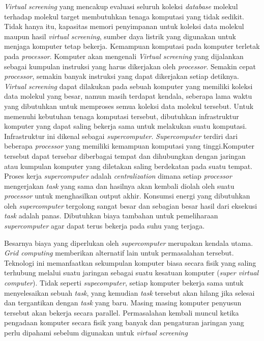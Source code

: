 \textit{Virtual screening} yang mencakup evaluasi seluruh koleksi \textit{database} molekul terhadap molekul target membutuhkan tenaga komputasi yang tidak sedikit. Tidak hanya itu, kapasitas memori penyimpanan untuk koleksi data molekul maupun hasil \textit{virtual screening}, sumber daya listrik yang digunakan untuk menjaga komputer tetap bekerja. Kemampuan komputasi pada komputer terletak pada \textit{processor}. Komputer akan mengenali \textit{Virtual screening} yang dijalankan sebagai kumpulan instruksi yang harus dikerjakan oleh \textit{processor}. Semakin cepat \textit{processor}, semakin banyak instruksi yang dapat dikerjakan setiap detiknya. \textit{Virtual screening} dapat dilakukan pada sebuah komputer yang memiliki koleksi data molekul yang besar, namun masih terdapat kendala, seberapa lama waktu yang dibutuhkan untuk memproses semua koleksi data molekul tersebut. Untuk memenuhi kebutuhan tenaga komputasi tersebut, dibutuhkan infrastruktur komputer yang dapat saling bekerja sama untuk melakukan suatu komputasi. Infrastruktur ini dikenal sebagai \textit{supercomputer}. \textit{Supercomputer} terdiri dari beberapa \textit{processor} yang memiliki kemampuan komputasi yang tinggi.Komputer tersebut dapat tersebar diberbagai tempat dan dihubungkan dengan jaringan atau kumpulan komputer yang diletakan saling berdekatan pada suatu tempat. Proses kerja \textit{supercomputer} adalah \textit{centralization} dimana setiap \textit{processor} mengerjakan \textit{task} yang sama dan hasilnya akan kembali diolah oleh suatu \textit{processor} untuk menghasilkan output akhir. Konsumsi energi yang dibutuhkan oleh \textit{supercomputer} tergolong sangat besar dan sebagian besar hasil dari eksekusi \textit{task} adalah panas. Dibutuhkan biaya tambahan untuk pemeliharaan \textit{supercomputer} agar dapat terus bekerja pada suhu yang terjaga.

Besarnya biaya yang diperlukan oleh \textit{supercomputer} merupakan kendala utama. \textit{Grid computing} memberikan alternatif lain untuk permasalahan tersebut. Teknologi ini memanfaatkan sekumpulan komputer biasa secara fisik yang saling terhubung melalui suatu jaringan sebagai suatu kesatuan komputer (\textit{super virtual computer}). Tidak seperti \textit{supecomputer}, setiap komputer bekerja sama untuk menyelesaikan sebuah \textit{task}, yang kemudian \textit{task} tersebut akan hilang jika selesai dan tergantikan dengan \textit{task} yang baru. Masing masing komputer penyusun tersebut akan bekerja secara parallel. Permasalahan kembali muncul ketika pengadaan komputer secara fisik yang banyak dan pengaturan jaringan yang perlu dipahami sebelum digunakan untuk \textit{virtual screening}

